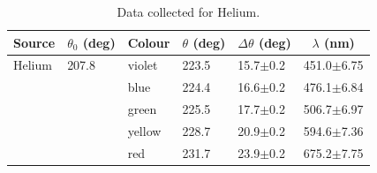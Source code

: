 \begin{enumerate}
\begin{table}[ht]
\center
\begin{tabular}{|l|l|l|l|l|l|}
\hline
\multicolumn{1}{|c|}{Source} & \multicolumn{1}{c|}{$\theta_0$ (deg)} & \multicolumn{1}{c|}{Colour} & \multicolumn{1}{c|}{$\theta$ (deg)} & \multicolumn{1}{c|}{$\Delta\theta$ (deg)} & \multicolumn{1}{c|}{$\lambda$ (nm)} \\ \hline
Helium                                   & 207.8                                 & violet                      & 223.5                               & 15.7$\pm$0.2                              & 451.0$\pm$6.75                      \\ \hline
                                         &                                       & blue                        & 224.4                               & 16.6$\pm$0.2                              & 476.1$\pm$6.84                      \\ \hline
                                         &                                       & green                       & 225.5                               & 17.7$\pm$0.2                              & 506.7$\pm$6.97                      \\ \hline
                                         &                                       & yellow                      & 228.7                               & 20.9$\pm$0.2                              & 594.6$\pm$7.36                      \\ \hline
                                         &                                       & red                         & 231.7                               & 23.9$\pm$0.2                              & 675.2$\pm$7.75                      \\ \hline
\end{tabular}
\caption{Data collected for Helium.}
\label{tab:spcg3}
\end{table}



\end{enumerate}
